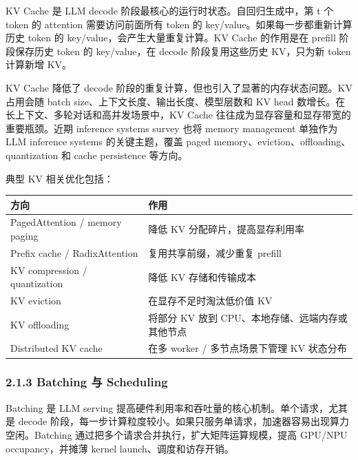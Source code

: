 \documentclass[a4paper,10pt]{ctexart}
\begin{document}
KV Cache 是 LLM decode 阶段最核心的运行时状态。自回归生成中，第 t 个 token 的 attention 需要访问前面所有 token 的 key/value。如果每一步都重新计算历史 token 的 key/value，会产生大量重复计算。KV Cache 的作用是在 prefill 阶段保存历史 token 的 key/value，在 decode 阶段复用这些历史 KV，只为新 token 计算新增 KV。


KV Cache 降低了 decode 阶段的重复计算，但也引入了显著的内存状态问题。KV 占用会随 batch size、上下文长度、输出长度、模型层数和 KV head 数增长。在长上下文、多轮对话和高并发场景中，KV Cache 往往成为显存容量和显存带宽的重要瓶颈。近期 inference systems survey 也将 memory management 单独作为 LLM inference systems 的关键主题，覆盖 paged memory、eviction、offloading、quantization 和 cache persistence 等方向。 


典型 KV 相关优化包括：


\begin{table}[H]
\centering
\scriptsize
\setlength{\tabcolsep}{3pt}
\renewcommand{\arraystretch}{1.15}
\begin{tabularx}{\textwidth}{|X|X|}
\hline
\textbf{\textbf{方向}} & \textbf{\textbf{作用}} \\ \hline
PagedAttention / memory paging & 降低 KV 分配碎片，提高显存利用率 \\ \hline
Prefix cache / RadixAttention & 复用共享前缀，减少重复 prefill \\ \hline
KV compression / quantization & 降低 KV 存储和传输成本 \\ \hline
KV eviction & 在显存不足时淘汰低价值 KV \\ \hline
KV offloading & 将部分 KV 放到 CPU、本地存储、远端内存或其他节点 \\ \hline
Distributed KV cache & 在多 worker / 多节点场景下管理 KV 状态分布 \\ \hline
\end{tabularx}
\end{table}




\subsubsection*{2.1.3 Batching 与 Scheduling}

Batching 是 LLM serving 提高硬件利用率和吞吐量的核心机制。单个请求，尤其是 decode 阶段，每一步计算粒度较小。如果只服务单请求，加速器容易出现算力空闲。Batching 通过把多个请求合并执行，扩大矩阵运算规模，提高 GPU/NPU occupancy，并摊薄 kernel launch、调度和访存开销。
\end{document}
